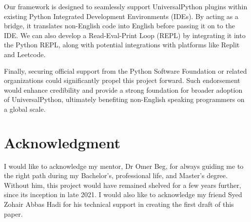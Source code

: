 \documentclass[conference]{IEEEtran}
\begin{document}
Our framework is designed to seamlessly support UniversalPython plugins within existing Python Integrated Development Environments (IDEs). By acting as a bridge, it translates non-English code into English before passing it on to the IDE. We can also develop a Read-Eval-Print Loop (REPL) by integrating it into the Python REPL, along with potential integrations with platforms like Replit and Leetcode.

Finally, securing official support from the Python Software Foundation or related organizations could significantly propel this project forward. Such endorsement would enhance credibility and provide a strong foundation for broader adoption of UniversalPython, ultimately benefiting non-English speaking programmers on a global scale.

\section*{Acknowledgment}

I would like to acknowledge my mentor, Dr Omer Beg, for always guiding me to the right path during my Bachelor's, professional life, and Master's degree. Without him, this project would have remained shelved for a few years further, since its inception in late 2021. I would also like to acknowledge my friend Syed Zohair Abbas Hadi for his technical support in creating the first draft of this paper.

 

\vspace{12pt}
\end{document}
